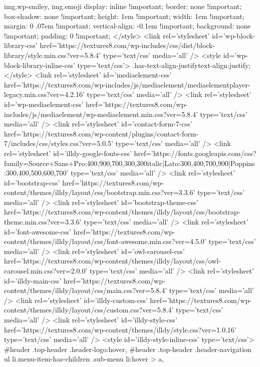img.wp-smiley,
img.emoji {
	display: inline !important;
	border: none !important;
	box-shadow: none !important;
	height: 1em !important;
	width: 1em !important;
	margin: 0 .07em !important;
	vertical-align: -0.1em !important;
	background: none !important;
	padding: 0 !important;
}
</style>
	<link rel='stylesheet' id='wp-block-library-css'  href='https://textures8.com/wp-includes/css/dist/block-library/style.min.css?ver=5.8.4' type='text/css' media='all' />
<style id='wp-block-library-inline-css' type='text/css'>
.has-text-align-justify{text-align:justify;}
</style>
<link rel='stylesheet' id='mediaelement-css'  href='https://textures8.com/wp-includes/js/mediaelement/mediaelementplayer-legacy.min.css?ver=4.2.16' type='text/css' media='all' />
<link rel='stylesheet' id='wp-mediaelement-css'  href='https://textures8.com/wp-includes/js/mediaelement/wp-mediaelement.min.css?ver=5.8.4' type='text/css' media='all' />
<link rel='stylesheet' id='contact-form-7-css'  href='https://textures8.com/wp-content/plugins/contact-form-7/includes/css/styles.css?ver=5.0.5' type='text/css' media='all' />
<link rel='stylesheet' id='illdy-google-fonts-css'  href='https://fonts.googleapis.com/css?family=Source+Sans+Pro:400,900,700,300,300italic|Lato:300,400,700,900|Poppins:300,400,500,600,700' type='text/css' media='all' />
<link rel='stylesheet' id='bootstrap-css'  href='https://textures8.com/wp-content/themes/illdy/layout/css/bootstrap.min.css?ver=3.3.6' type='text/css' media='all' />
<link rel='stylesheet' id='bootstrap-theme-css'  href='https://textures8.com/wp-content/themes/illdy/layout/css/bootstrap-theme.min.css?ver=3.3.6' type='text/css' media='all' />
<link rel='stylesheet' id='font-awesome-css'  href='https://textures8.com/wp-content/themes/illdy/layout/css/font-awesome.min.css?ver=4.5.0' type='text/css' media='all' />
<link rel='stylesheet' id='owl-carousel-css'  href='https://textures8.com/wp-content/themes/illdy/layout/css/owl-carousel.min.css?ver=2.0.0' type='text/css' media='all' />
<link rel='stylesheet' id='illdy-main-css'  href='https://textures8.com/wp-content/themes/illdy/layout/css/main.css?ver=5.8.4' type='text/css' media='all' />
<link rel='stylesheet' id='illdy-custom-css'  href='https://textures8.com/wp-content/themes/illdy/layout/css/custom.css?ver=5.8.4' type='text/css' media='all' />
<link rel='stylesheet' id='illdy-style-css'  href='https://textures8.com/wp-content/themes/illdy/style.css?ver=1.0.16' type='text/css' media='all' />
<style id='illdy-style-inline-css' type='text/css'>
#header .top-header .header-logo:hover,
#header .top-header .header-navigation ul li.menu-item-has-children .sub-menu li:hover > a,
